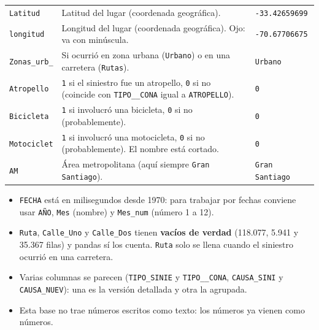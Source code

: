 \documentclass[10.5pt]{article}
\begin{document}
\begin{xltabular}{\linewidth}{@{}p{4.5cm} >{\raggedright\arraybackslash}X p{3.4cm}@{}}
\texttt{Latitud} & Latitud del lugar (coordenada geográfica). & \texttt{-33.42659699} \\
\texttt{longitud} & Longitud del lugar (coordenada geográfica). Ojo: va con minúscula. & \texttt{-70.67706675} \\
\texttt{Zonas\_\allowbreak{}urb\_\allowbreak{}} & Si ocurrió en zona urbana (\texttt{Urbano}) o en una carretera (\texttt{Rutas}). & \texttt{Urbano} \\
\texttt{Atropello} & \texttt{1} si el siniestro fue un atropello, \texttt{0} si no (coincide con \texttt{TIPO\_\allowbreak{}\_\allowbreak{}CONA} igual a \texttt{ATROPELLO}). & \texttt{0} \\
\texttt{Bicicleta} & \texttt{1} si involucró una bicicleta, \texttt{0} si no (probablemente). & \texttt{0} \\
\texttt{Motociclet} & \texttt{1} si involucró una motocicleta, \texttt{0} si no (probablemente). El nombre está cortado. & \texttt{0} \\
\texttt{AM} & Área metropolitana (aquí siempre \texttt{Gran Santiago}). & \texttt{Gran Santiago} \\
\end{xltabular}

\begin{alertabox}
\begin{itemize}[leftmargin=1.1em,itemsep=2pt,topsep=2pt]
\item \texttt{FECHA} está en milisegundos desde 1970: para trabajar por fechas conviene usar \texttt{AÑO}, \texttt{Mes} (nombre) y \texttt{Mes\_\allowbreak{}num} (número 1 a 12).
\item \texttt{Ruta}, \texttt{Calle\_\allowbreak{}Uno} y \texttt{Calle\_\allowbreak{}Dos} tienen \textbf{vacíos de verdad} (118.077, 5.941 y 35.367 filas) y pandas sí los cuenta. \texttt{Ruta} solo se llena cuando el siniestro ocurrió en una carretera.
\item Varias columnas se parecen (\texttt{TIPO\_\allowbreak{}SINIE} y \texttt{TIPO\_\allowbreak{}\_\allowbreak{}CONA}, \texttt{CAUSA\_\allowbreak{}SINI} y \texttt{CAUSA\_\allowbreak{}NUEV}): una es la versión detallada y otra la agrupada.
\item Esta base no trae números escritos como texto: los números ya vienen como números.
\end{itemize}
\end{alertabox}

\newpage
{}\label{base8}\hypertarget{base8}{}
\end{document}
